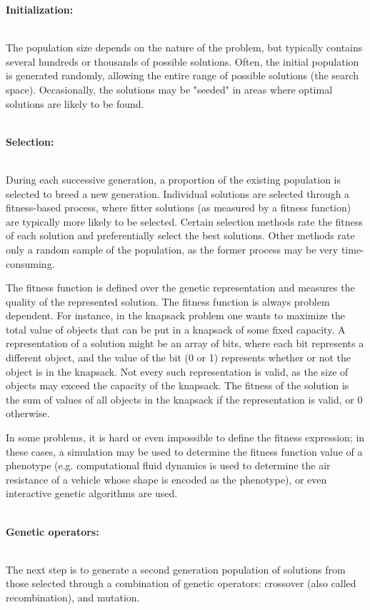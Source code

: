 \documentclass[a4paper, 12pt]{article}
\begin{document}
\begin{large}\textbf{Initialization:}\end{large}\\
The population size depends on the nature of the problem, but typically contains several hundreds or thousands of possible solutions. Often, the initial population is generated randomly, allowing the entire range of possible solutions (the search space). Occasionally, the solutions may be "seeded" in areas where optimal solutions are likely to be found.\\~\\
\begin{large}\textbf{Selection:}\end{large}\\
During each successive generation, a proportion of the existing population is selected to breed a new generation. Individual solutions are selected through a fitness-based process, where fitter solutions (as measured by a fitness function) are typically more likely to be selected. Certain selection methods rate the fitness of each solution and preferentially select the best solutions. Other methods rate only a random sample of the population, as the former process may be very time-consuming.

The fitness function is defined over the genetic representation and measures the quality of the represented solution. The fitness function is always problem dependent. For instance, in the knapsack problem one wants to maximize the total value of objects that can be put in a knapsack of some fixed capacity. A representation of a solution might be an array of bits, where each bit represents a different object, and the value of the bit (0 or 1) represents whether or not the object is in the knapsack. Not every such representation is valid, as the size of objects may exceed the capacity of the knapsack. The fitness of the solution is the sum of values of all objects in the knapsack if the representation is valid, or 0 otherwise.

In some problems, it is hard or even impossible to define the fitness expression; in these cases, a simulation may be used to determine the fitness function value of a phenotype (e.g. computational fluid dynamics is used to determine the air resistance of a vehicle whose shape is encoded as the phenotype), or even interactive genetic algorithms are used.\\~\\
\begin{large}\textbf{Genetic operators:}\end{large}\\
The next step is to generate a second generation population of solutions from those selected through a combination of genetic operators: crossover (also called recombination), and mutation.
\end{document}
